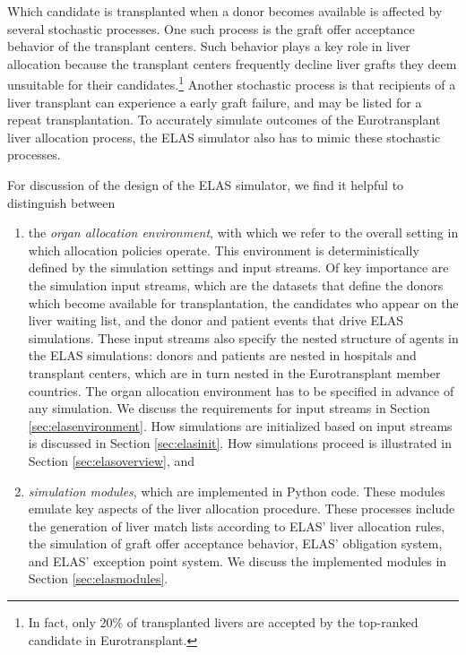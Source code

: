 \documentclass[11pt,twoside,]{book}
\let\rmarkdownfootnote\footnote%
\def\footnote{\protect\rmarkdownfootnote}
\begin{document}
Which candidate is transplanted when a donor becomes available is affected by several stochastic processes.
One such process is the graft offer acceptance behavior of the transplant centers.
Such behavior plays a
key role in liver allocation because the transplant centers frequently
decline liver grafts they deem unsuitable for their candidates.\footnote{In fact, only 20\% of transplanted livers are accepted
  by the top-ranked candidate in Eurotransplant.} Another stochastic
process is that recipients of a
liver transplant can experience a early graft failure, and may be listed for a
repeat transplantation. To accurately simulate outcomes of the
Eurotransplant liver allocation process, the ELAS simulator also has to
mimic these stochastic processes.

For discussion of the design of the ELAS simulator, we find it helpful
to distinguish between

\begin{enumerate}
\def\labelenumi{\arabic{enumi}.}
\item
  the \emph{organ allocation environment}, with which we refer to the
  overall setting in which allocation policies operate. This
  environment is deterministically defined by the simulation settings
  and input streams. Of key importance are the simulation input streams, which
  are the datasets that define the donors which become available for
  transplantation, the candidates who appear on the liver waiting
  list, and the donor and patient events that drive ELAS simulations.
  These input streams also specify the nested structure of agents in
  the ELAS simulations: donors and patients are nested in hospitals and
  transplant centers, which are in turn nested in the
  Eurotransplant member countries. The organ allocation environment has
  to be specified in advance of any simulation. We discuss the
  requirements for input streams in Section
  \ref{sec:elasenvironment}. How simulations are
  initialized based on input streams is discussed in Section
  \ref{sec:elasinit}. How simulations proceed is
  illustrated in Section
  \ref{sec:elasoverview}, and
\item
  \emph{simulation modules}, which are implemented in Python code. These
  modules emulate key aspects of the liver allocation procedure. These
  processes include the generation of liver match lists according to
  ELAS' liver allocation rules, the simulation of graft offer acceptance
  behavior, ELAS' obligation system, and ELAS' exception point system.
  We discuss the implemented modules in Section
  \ref{sec:elasmodules}.
\end{enumerate}
\end{document}
